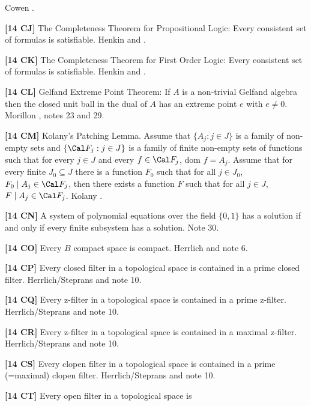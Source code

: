 \ac{Cowen} \cite{1990}.
\smallskip
\item{}{\bf [14 CJ]} The Completeness Theorem for Propositional Logic:
Every consistent set of formulas is satisfiable.  \ac{Henkin} \cite{1954a}
and \cite{1954b}.
\smallskip
\item{}{\bf [14 CK]} The Completeness Theorem for First Order Logic:
Every consistent set of formulas is satisfiable.  \ac{Henkin} \cite{1954a}
and \cite{1954b}.
\smallskip
\item{}{\bf [14 CL]} Gelfand Extreme Point Theorem:  If $A$ is a
non-trivial Gelfand algebra then the closed unit ball in the dual
of $A$ has an extreme point $e$ with $e\ne 0$. \ac{Morillon} \cite{1986},
notes 23 and 29. 
\smallskip
\item{}{\bf [14 CM]} Kolany's Patching Lemma.  Assume that
$\{A_j : j\in J\}$ is a family of non-empty sets and $\{ \Cal F_j :
j\in J\}$ is a family of finite non-empty sets of functions such that
for every $j\in J$ and every $f\in \Cal F_j$, dom $f = A_j$.  Assume
that for every finite $J_0 \subseteq J$ there is a function $F_0$ such
that for all $j\in J_0$, $F_0\mid A_j \in \Cal F_j$, then there exists
a function $F$ such that for all $j\in J$, $F\mid A_j \in \Cal F_j$.
\ac{Kolany} \cite{1999}. 
\smallskip
\item{}{\bf [14 CN]} A system of polynomial equations over the field
$\{0,1\}$ has a solution if and only if every finite subsystem has
a solution. Note 30.
\smallskip
\item{}{\bf [14 CO]} Every $B$ compact space is compact.  \ac{Herrlich}
\cite{1996a} and note 6.
\smallskip
\item{}{\bf [14 CP]} Every closed filter in a topological space is
contained in a prime closed filter.  \ac{Herrlich/Steprans}
\cite{1997} and note 10.
\smallskip
\item{}{\bf [14 CQ]} Every z-filter in a topological space is contained
in a prime z-filter.  \ac{Herrlich/Steprans} \cite{1997} and note 10.
\smallskip
\item{}{\bf [14 CR]} Every z-filter in a topological space is contained
in a maximal z-filter. \ac{Herrlich/Steprans} \cite{1997} and note 10.
\smallskip
\item{}{\bf [14 CS]} Every clopen filter in a topological space is
contained in a prime (=maximal) clopen filter. \ac{Herrlich/Steprans}
\cite{1997} and note 10.
\smallskip
\item{}{\bf [14 CT]} Every open filter in a topological space is
